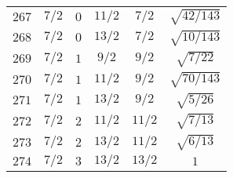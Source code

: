 \begin{table}
\begin{center}
\begin{tabular}{|c|c|c|c|c|c|}
$267$ & $7/2$ & $0$ & $11/2$ & $7/2$ & $\sqrt{42/143}$ \\ 
$268$ & $7/2$ & $0$ & $13/2$ & $7/2$ & $\sqrt{10/143}$ \\ 
$269$ & $7/2$ & $1$ & $9/2$ & $9/2$ & $\sqrt{7/22}$ \\ 
$270$ & $7/2$ & $1$ & $11/2$ & $9/2$ & $\sqrt{70/143}$ \\ 
$271$ & $7/2$ & $1$ & $13/2$ & $9/2$ & $\sqrt{5/26}$ \\ 
$272$ & $7/2$ & $2$ & $11/2$ & $11/2$ & $\sqrt{7/13}$ \\ 
$273$ & $7/2$ & $2$ & $13/2$ & $11/2$ & $\sqrt{6/13}$ \\ 
$274$ & $7/2$ & $3$ & $13/2$ & $13/2$ & $1$ \\ 
\hline 
\end{tabular}
\end{center}
\end{table}

